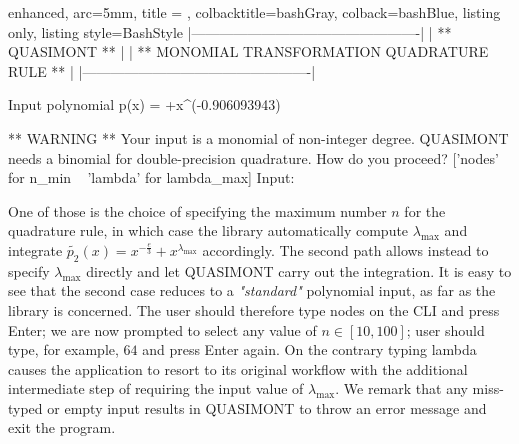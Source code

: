 \documentclass[a4paper, twosided]{book}
\begin{document}
\vspace{0.2cm}
\begin{tcblisting}{enhanced,
                   arc=5mm,
                   title = \color{black}{\large \ttfamily Building and executing the test driver: p\_2(x)},
                   colbacktitle=bashGray,
                   colback=bashBlue,
                   listing only,
                   listing style=BashStyle}
    |-------------------------------------------------|
    |                 ** QUASIMONT **                 |
    |  ** MONOMIAL TRANSFORMATION QUADRATURE RULE **  |
    |-------------------------------------------------|

 Input polynomial p(x) =  +x^(-0.906093943) 

 ** WARNING ** Your input is a monomial of non-integer degree.
               QUASIMONT needs a binomial for double-precision quadrature.
               How do you proceed? ['nodes' for n_min ~ 'lambda' for lambda_max]
               Input: 
\end{tcblisting}
\vspace{0.3cm}

\noindent
One of those is the choice of specifying the maximum number $n$ for the quadrature rule, in which case the library  automatically compute $\lambda_{\text{max}}$ and integrate $\tilde{p_2}(x) = x^{-\frac{e}{3}} + x^{\lambda_\text{max}}$ accordingly. The second path allows instead to specify $\lambda_{\text{max}}$ directly and let QUASIMONT carry out the integration. It is easy to see that the second case reduces to a \textsl{"standard"} polynomial input, as far as the library is concerned. The user should therefore type \colorbox{poliGrayBlue}{nodes} on the CLI and press Enter; we are now prompted to select any value of $n\in[10,100]$; user should type, for example, $64$ and press Enter again. On the contrary typing \colorbox{poliGrayBlue}{lambda} causes the application to resort to its original workflow with the additional intermediate step of requiring the input value of $\lambda_{\text{max}}$. We remark that any miss-typed or empty input results in QUASIMONT to throw an error message and exit the program. 
\end{document}

